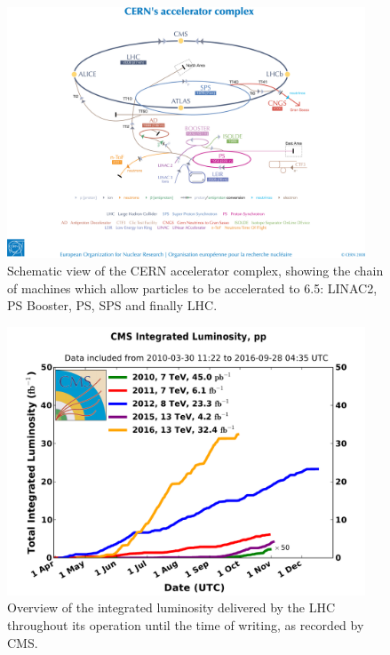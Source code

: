 \begin{figure}[h]
\centering
\includegraphics[width=0.95\textwidth]{detectorFigures/accelerators.jpg}
\caption{Schematic view of the CERN accelerator complex, showing the chain of machines which allow particles to be accelerated to 6.5\TeV: LINAC2, PS Booster, PS, SPS and finally LHC.~~\cite{Christiane:1260465}}
\label{fig:accelerators}
\end{figure}

\begin{figure}[h]
\centering
\includegraphics[width=0.95\textwidth]{detectorFigures/int_lumi_cumulative_pp_2_280916.pdf}
\caption{Overview of the integrated luminosity delivered by the LHC throughout its operation until the time of writing, as recorded by CMS.~~\cite{CMSLumiPublic}}
\label{fig:totalintlumi}
\end{figure}

